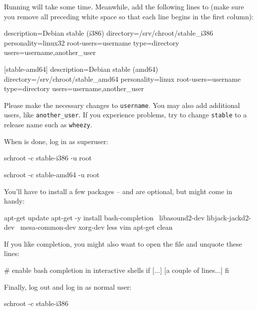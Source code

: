 Running  will take some time.  Meanwhile, add the
following lines to  (make sure you
remove all preceding white space so that each line begins in the first
column):

\begin{VerbatimBoth}
  [stable-i386]
  description=Debian stable (i386)
  directory=/srv/chroot/stable_i386
  personality=linux32
  root-users=username
  type=directory
  users=username,another_user

  [stable-amd64]
  description=Debian stable (amd64)
  directory=/srv/chroot/stable_amd64
  personality=linux
  root-users=username
  type=directory
  users=username,another_user
\end{VerbatimBoth}

Please make the necessary changes to \texttt{username}.  You may also
add additional users, like \texttt{another\_user}.  If you experience
problems, try to change \texttt{stable} to a release name such as
\texttt{wheezy}.

When  is done, log in as superuser:

\begin{Verbatim32}
  schroot -c stable-i386 -u root
\end{Verbatim32}

\begin{Verbatim64}
  schroot -c stable-amd64 -u root
\end{Verbatim64}

You'll have to install a few packages --  and 
are optional, but might come in handy:

\begin{VerbatimBoth}
  apt-get update
  apt-get -y install bash-completion \
    libasound2-dev libjack-jackd2-dev \
    mesa-common-dev xorg-dev less vim
  apt-get clean
\end{VerbatimBoth}

If you like  completion, you might also want to open the
file  and unquote these lines:

\begin{VerbatimBoth}
  # enable bash completion in interactive shells
  if [...]
    [a couple of lines...]
  fi
\end{VerbatimBoth}

Finally, log out and log in as normal user:

\begin{Verbatim32}
  schroot -c stable-i386
\end{Verbatim32}

